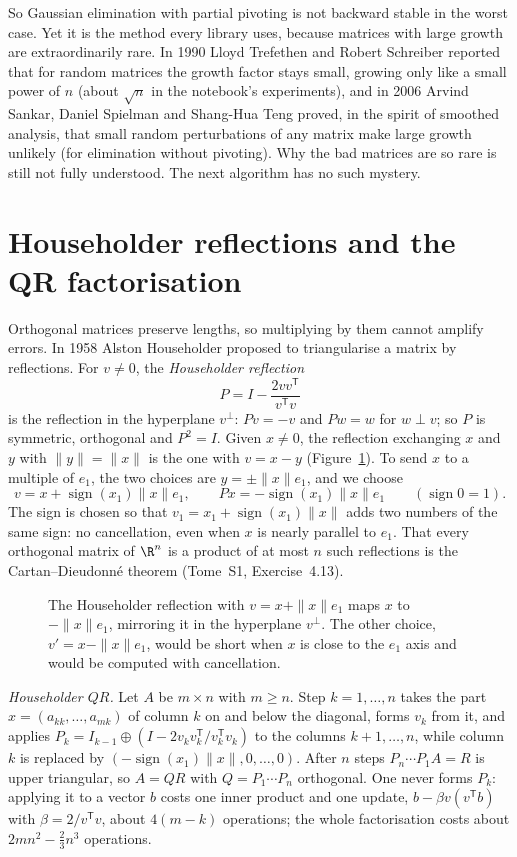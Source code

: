 So Gaussian elimination with partial pivoting is not backward stable in the worst case. Yet it is the method every library uses, because matrices
with large growth are extraordinarily rare. In 1990 Lloyd Trefethen and Robert Schreiber reported that for random matrices the growth factor
stays small, growing only like a small power of $n$ (about $\sqrt n$ in the notebook's experiments), and in 2006 Arvind Sankar, Daniel Spielman and Shang-Hua Teng proved, in the spirit of smoothed analysis, that small random
perturbations of any matrix make large growth unlikely (for elimination without pivoting). Why the bad matrices are so rare is still not fully
understood. The next algorithm has no such mystery.

\section{Householder reflections and the QR factorisation}\label{sec:householder}

Orthogonal matrices preserve lengths, so multiplying by them cannot amplify errors. In 1958 Alston Householder proposed to triangularise a matrix by
reflections. For $v\ne0$, the \emph{Householder reflection}
\[
P=I-\frac{2vv^{\mathsf T}}{v^{\mathsf T}v}
\]
is the reflection in the hyperplane $v^\perp$: $Pv=-v$ and $Pw=w$ for $w\perp v$; so $P$ is symmetric, orthogonal and $P^2=I$. Given $x\ne0$, the
reflection exchanging $x$ and $y$ with $\|y\|=\|x\|$ is the one with $v=x-y$ (Figure~\ref{fig:householder}). To send $x$ to a multiple of $e_1$, the two
choices are $y=\pm\|x\|e_1$, and we choose
\[
v=x+\operatorname{sign}(x_1)\|x\|e_1,\qquad Px=-\operatorname{sign}(x_1)\|x\|e_1\qquad(\operatorname{sign}0=1).
\]
The sign is chosen so that $v_1=x_1+\operatorname{sign}(x_1)\|x\|$ adds two numbers of the same sign: no cancellation, even when $x$ is nearly parallel
to $e_1$. That every orthogonal matrix of $\R^n$ is a product of at most $n$ such reflections is the Cartan--Dieudonn\'e theorem (Tome~S1, Exercise~4.13).

\begin{figure}[ht]
\centering
{}
\caption{The Householder reflection with $v=x+\|x\|e_1$ maps $x$ to $-\|x\|e_1$, mirroring it in the hyperplane $v^\perp$. The other choice, $v'=x-\|x\|e_1$,
would be short when $x$ is close to the $e_1$ axis and would be computed with cancellation.}
\label{fig:householder}
\end{figure}

\emph{Householder $QR$.} Let $A$ be $m\times n$ with $m\ge n$. Step $k=1,\dots,n$ takes the part $x=(a_{kk},\dots,a_{mk})$ of column $k$ on and below the
diagonal, forms $v_k$ from it, and applies $P_k=I_{k-1}\oplus(I-2v_kv_k^{\mathsf T}/v_k^{\mathsf T}v_k)$ to the columns $k+1,\dots,n$, while column $k$ is
replaced by $(-\operatorname{sign}(x_1)\|x\|,0,\dots,0)$. After $n$ steps $P_n\cdots P_1A=R$ is upper triangular, so $A=QR$ with $Q=P_1\cdots P_n$
orthogonal. One never forms $P_k$: applying it to a vector $b$ costs one inner product and one update, $b-\beta v(v^{\mathsf T}b)$ with
$\beta=2/v^{\mathsf T}v$, about $4(m-k)$ operations; the whole factorisation costs about $2mn^2-\frac23n^3$ operations.

